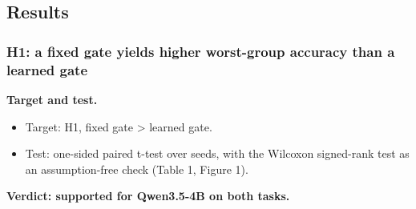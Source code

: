 \subsection{Results}

\subsubsection{H1: a fixed gate yields higher worst-group accuracy than a learned gate}

\textbf{Target and test.}

\begin{itemize}
\tightlist
\item
  Target: H1, fixed gate \textgreater{} learned gate.
\item
  Test: one-sided paired t-test over seeds, with the Wilcoxon signed-rank test as an assumption-free check
  (Table 1, Figure 1).
\end{itemize}

\textbf{Verdict: supported for Qwen3.5-4B on both tasks.}

